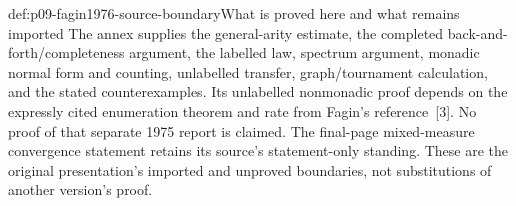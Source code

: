 \begin{proofboundary}{def:p09-fagin1976-source-boundary}{What is proved here and what remains imported}
The annex supplies the general-arity estimate, the completed
back-and-forth/completeness argument, the labelled law, spectrum argument,
monadic normal form and counting, unlabelled transfer, graph/tournament
calculation, and the stated counterexamples.  Its unlabelled nonmonadic
proof depends on the expressly cited enumeration theorem and rate from
Fagin's reference~[3].  No proof of that separate 1975 report is claimed.
The final-page mixed-measure convergence statement retains its source's
statement-only standing.  These are the original presentation's imported
and unproved boundaries, not substitutions of another version's proof.
\end{proofboundary}

